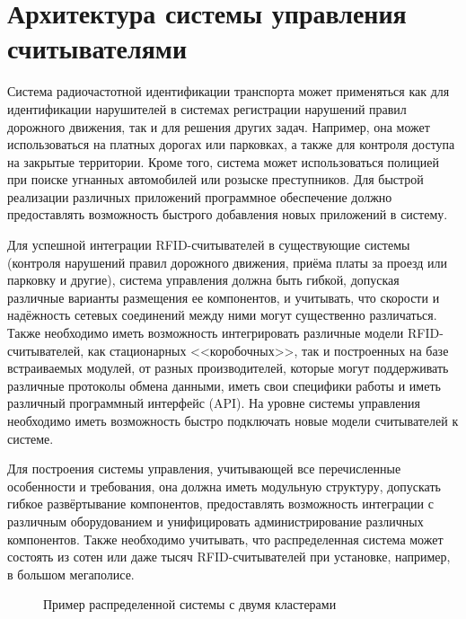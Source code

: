 \section{Архитектура системы управления считывателями}\label{sec:ch5_architecture}

Система радиочастотной идентификации транспорта может применяться как для идентификации нарушителей в системах регистрации нарушений правил дорожного движения, так и для решения других задач. Например, она может использоваться на платных дорогах или парковках, а также для контроля доступа на закрытые территории. Кроме того, система может использоваться полицией при поиске угнанных автомобилей или розыске преступников. Для быстрой реализации различных приложений программное обеспечение должно предоставлять возможность быстрого добавления новых приложений в систему.

Для успешной интеграции RFID-считывателей в существующие системы (контроля нарушений правил дорожного движения, приёма платы за проезд или парковку и другие), система управления должна быть гибкой, допуская различные варианты размещения ее компонентов, и учитывать, что скорости и надёжность сетевых соединений между ними могут существенно различаться. Также необходимо иметь возможность интегрировать различные модели RFID-считывателей, как стационарных <<коробочных>>, так и построенных на базе встраиваемых модулей, от разных производителей, которые могут поддерживать различные протоколы обмена данными, иметь свои специфики работы и иметь различный программный интерфейс (API). На уровне системы управления необходимо иметь возможность быстро подключать новые модели считывателей к системе.

Для построения системы управления, учитывающей все перечисленные особенности и требования, она должна иметь модульную структуру, допускать гибкое развёртывание компонентов, предоставлять возможность интеграции с различным оборудованием и унифицировать администрирование различных компонентов. Также необходимо учитывать, что распределенная система может состоять из сотен или даже тысяч RFID-считывателей при установке, например, в большом мегаполисе.

\begin{figure}[ht] 
  \caption{Пример распределенной системы с двумя кластерами}
  \label{fig:ch5_system_example}
\end{figure}

